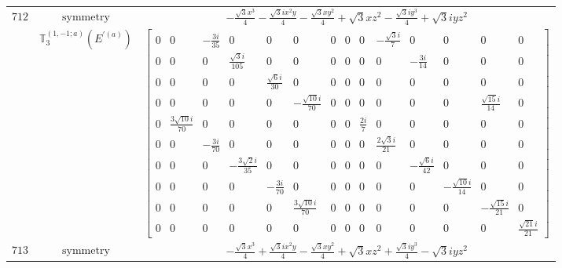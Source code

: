 \documentclass[fleqn,8pt,landscape]{jsarticle}
\begin{document}
\begin{longtable}{ccc}
$ 712 $ & $ \text{symmetry} $ & $ - \frac{\sqrt{3} x^{3}}{4} - \frac{\sqrt{3} i x^{2} y}{4} - \frac{\sqrt{3} x y^{2}}{4} + \sqrt{3} x z^{2} - \frac{\sqrt{3} i y^{3}}{4} + \sqrt{3} i y z^{2} $ \\
$  $ & $ \mathbb{T}_{3}^{(1,-1;a)}(E^{\prime(a)}) $ & $ \begin{bmatrix} 0 & 0 & - \frac{3 i}{35} & 0 & 0 & 0 & 0 & 0 & 0 & - \frac{\sqrt{3} i}{7} & 0 & 0 & 0 & 0 \\ 0 & 0 & 0 & \frac{\sqrt{3} i}{105} & 0 & 0 & 0 & 0 & 0 & 0 & - \frac{3 i}{14} & 0 & 0 & 0 \\ 0 & 0 & 0 & 0 & \frac{\sqrt{6} i}{30} & 0 & 0 & 0 & 0 & 0 & 0 & 0 & 0 & 0 \\ 0 & 0 & 0 & 0 & 0 & - \frac{\sqrt{10} i}{70} & 0 & 0 & 0 & 0 & 0 & 0 & \frac{\sqrt{15} i}{14} & 0 \\ 0 & \frac{3 \sqrt{10} i}{70} & 0 & 0 & 0 & 0 & 0 & 0 & \frac{2 i}{7} & 0 & 0 & 0 & 0 & 0 \\ 0 & 0 & - \frac{3 i}{70} & 0 & 0 & 0 & 0 & 0 & 0 & \frac{2 \sqrt{3} i}{21} & 0 & 0 & 0 & 0 \\ 0 & 0 & 0 & - \frac{3 \sqrt{2} i}{35} & 0 & 0 & 0 & 0 & 0 & 0 & - \frac{\sqrt{6} i}{42} & 0 & 0 & 0 \\ 0 & 0 & 0 & 0 & - \frac{3 i}{70} & 0 & 0 & 0 & 0 & 0 & 0 & - \frac{\sqrt{10} i}{14} & 0 & 0 \\ 0 & 0 & 0 & 0 & 0 & \frac{3 \sqrt{10} i}{70} & 0 & 0 & 0 & 0 & 0 & 0 & - \frac{\sqrt{15} i}{21} & 0 \\ 0 & 0 & 0 & 0 & 0 & 0 & 0 & 0 & 0 & 0 & 0 & 0 & 0 & \frac{\sqrt{21} i}{21} \end{bmatrix} $ \\ \hline
$ 713 $ & $ \text{symmetry} $ & $ - \frac{\sqrt{3} x^{3}}{4} + \frac{\sqrt{3} i x^{2} y}{4} - \frac{\sqrt{3} x y^{2}}{4} + \sqrt{3} x z^{2} + \frac{\sqrt{3} i y^{3}}{4} - \sqrt{3} i y z^{2} $ \\

\end{longtable}
\end{document}
